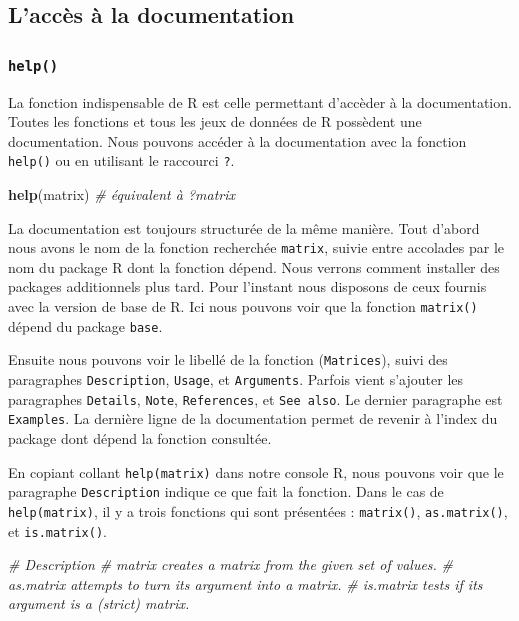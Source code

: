 \documentclass[]{book}
\newenvironment{Shaded}{\begin{snugshade}}{\end{snugshade}}
\newcommand{\CommentTok}[1]{\textcolor[rgb]{0.56,0.35,0.01}{\textit{#1}}}
\newcommand{\KeywordTok}[1]{\textcolor[rgb]{0.13,0.29,0.53}{\textbf{#1}}}
\newcommand{\NormalTok}[1]{#1}
\begin{document}
\hypertarget{lacces-a-la-documentation}{%
\subsection{L'accès à la documentation}\label{lacces-a-la-documentation}}

\hypertarget{l015help}{%
\subsubsection{\texorpdfstring{\texttt{help()}}{help()}}\label{l015help}}

La fonction indispensable de R est celle permettant d'accèder à la documentation. Toutes les fonctions et tous les jeux de données de R possèdent une documentation. Nous pouvons accéder à la documentation avec la fonction \texttt{help()} ou en utilisant le raccourci \texttt{?}.

\begin{Shaded}
\begin{Highlighting}[]
\KeywordTok{help}\NormalTok{(matrix) }\CommentTok{# équivalent à ?matrix}
\end{Highlighting}
\end{Shaded}

La documentation est toujours structurée de la même manière. Tout d'abord nous avons le nom de la fonction recherchée \texttt{matrix}, suivie entre accolades par le nom du package R dont la fonction dépend. Nous verrons comment installer des packages additionnels plus tard. Pour l'instant nous disposons de ceux fournis avec la version de base de R. Ici nous pouvons voir que la fonction \texttt{matrix()} dépend du package \texttt{base}.

Ensuite nous pouvons voir le libellé de la fonction (\texttt{Matrices}), suivi des paragraphes \texttt{Description}, \texttt{Usage}, et \texttt{Arguments}. Parfois vient s'ajouter les paragraphes \texttt{Details}, \texttt{Note}, \texttt{References}, et \texttt{See\ also}. Le dernier paragraphe est \texttt{Examples}. La dernière ligne de la documentation permet de revenir à l'index du package dont dépend la fonction consultée.

En copiant collant \texttt{help(matrix)} dans notre console R, nous pouvons voir que le paragraphe \texttt{Description} indique ce que fait la fonction. Dans le cas de \texttt{help(matrix)}, il y a trois fonctions qui sont présentées : \texttt{matrix()}, \texttt{as.matrix()}, et \texttt{is.matrix()}.

\begin{Shaded}
\begin{Highlighting}[]
\CommentTok{# Description}
\CommentTok{# matrix creates a matrix from the given set of values.}
\CommentTok{# as.matrix attempts to turn its argument into a matrix.}
\CommentTok{# is.matrix tests if its argument is a (strict) matrix.}
\end{Highlighting}
\end{Shaded}
\end{document}
